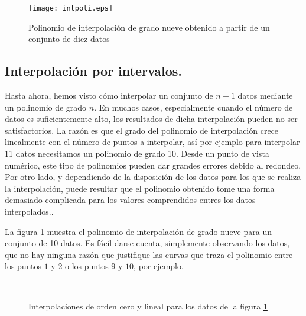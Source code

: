 

\begin{figure}[h]
\centering
\texttt{[image: intpoli.eps]}
\caption{Polinomio de interpolación de grado nueve obtenido a partir de un conjunto de diez datos} 
\label{fig:intepol}
\end{figure}
\begin{paracol}{2}
\section{Interpolación por intervalos.}
Hasta ahora, hemos visto cómo interpolar un conjunto de $n+1$ datos mediante un polinomio de grado $n$. En muchos casos, especialmente cuando el número de datos es suficientemente alto, los resultados de dicha interpolación pueden no ser satisfactorios.  La razón es que el grado del polinomio de interpolación crece linealmente con el número de puntos a interpolar, así por ejemplo para interpolar 11 datos necesitamos un polinomio de grado 10. Desde un punto de vista numérico, este tipo de polinomios pueden dar grandes errores debido al redondeo. Por otro lado, y dependiendo de la disposición de los datos para los que se realiza la interpolación, puede resultar que el polinomio obtenido tome una forma demasiado complicada para los valores comprendidos entres los datos interpolados..  

La figura \ref{fig:intepol} muestra el polinomio de interpolación de grado nueve para un conjunto de 10 datos. Es fácil darse cuenta, simplemente observando los datos, que no hay ninguna razón que justifique las curvas que traza el polinomio entre los puntos $1$ y $2$  o los puntos $9$ y $10$, por ejemplo.
\end{paracol}
\begin{figure}
\centering
{} %
{}\\
\caption{Interpolaciones de orden cero y lineal para los datos de la figura \ref{fig:intepol} }
\end{figure}

